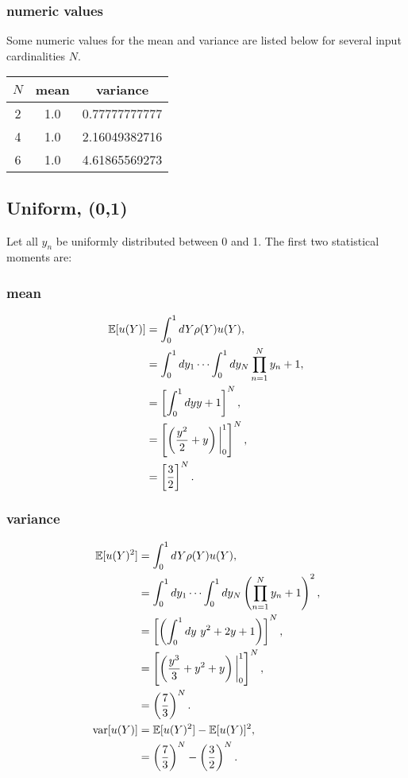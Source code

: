 \subsubsection{numeric values}
Some numeric values for the mean and variance are listed below for several input cardinalities $N$.
\begin{table}[h!]
  \centering
  \begin{tabular}{c|c|c}
    $N$ & mean & variance \\ \hline
    2 & 1.0 & 0.77777777777 \\
    4 & 1.0 & 2.16049382716 \\
    6 & 1.0 & 4.61865569273
  \end{tabular}
\end{table}

\subsection{Uniform, (0,1)}
Let all $y_n$ be uniformly distributed between 0 and 1.  The first two statistical moments are:

\subsubsection{mean}
\begin{align}
\mathbb{E}[ u(Y)] &=\int_{0}^1 dY \rho(Y)u(Y),\\
  &=\int_{0}^1 dy_1\cdots\int_{0}^1 dy_N \prod_{n=1}^N y_n+1,\\
  &=\left[ \int_{0}^1 dy y+1\right]^N,\\
  &=\left[\left(\frac{y^2}{2}+y\right)\bigg|_{0}^1\right]^N,\\
  &=\left[\frac{3}{2}\right]^N.
\end{align}

\subsubsection{variance}
\begin{align}
\mathbb{E}[ u(Y)^2] &= \int_{0}^1 dY \rho(Y)u(Y),\\
  &=\int_{0}^1 dy_1\cdots\int_{0}^1 dy_N \left(\prod_{n=1}^N y_n+1\right)^2,\\
  &=\left[\left(\int_{0}^1 dy\ y^2+2y+1 \right)\right]^N,\\
  &=\left[\left(\frac{y^3}{3}+y^2+y \right)\bigg|_{0}^1 \right]^N,\\
  &=\left(\frac{7}{3}\right)^N.\\
\text{var}[u(Y)] &= \mathbb{E}[ u(Y)^2]-\mathbb{E}[ u(Y)]^2,\\
  &= \left(\frac{7}{3}\right)^N-\left(\frac{3}{2}\right)^N.
\end{align}

